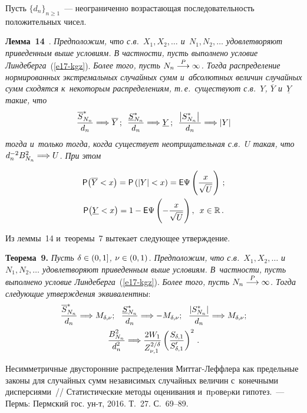 \begin{multicols}{2}
Пусть $\{d_n\}_{n\ge1}$~--- неограниченно возрастающая
последовательность положительных чисел.

\smallskip

\noindent
\textbf{Лемма~14}~\cite{Korolev1994}. \textit{Предположим, что с.в.\
$X_1,X_2,\ldots$ и~$N_1,N_2,\ldots$ удовлетворяют приведенным выше
условиям. В частности, пусть выполнено условие Линдеберга}~(\ref{e17-kgz}).
\textit{Более того, пусть $N_n\stackrel{P}{\longrightarrow}\infty$. Тогда распределение нормированных
экстремальных случайных сумм и~абсолютных величин случайных сумм
сходятся к~некоторым распределениям, т.\,е.\ существуют с.в.~$Y$,
$\overline Y$ и~$\underline Y$ такие, что}
$$
\displaystyle\frac{\displaystyle \overline S^*_{N_n}\mathstrut}{\displaystyle d_n\mathstrut}\Longrightarrow \overline Y\,;\enskip 
\displaystyle\frac{\displaystyle \underline S^*_{N_n}\mathstrut}{\displaystyle d_n\mathstrut}\Longrightarrow \underline Y\,; \enskip
\displaystyle\frac{\displaystyle \left\vert S^*_{N_n}\right\vert\mathstrut}{\displaystyle d_n\mathstrut}\Longrightarrow |Y|
$$
\textit{тогда и~только тогда, когда существует неотрицательная с.в.~$U$
такая, что $d_n^{-2}B^2_{N_n}\hm\Longrightarrow U$. При этом}

\noindent
\begin{gather*}
{\sf P}\big(\overline Y<x\big)={\sf P}\left(|Y|<x\right)= {\sf E}
\Psi\left(\displaystyle\frac{\displaystyle x\mathstrut}{\displaystyle \sqrt{U}\mathstrut}\right)\,;\\ 
{\sf P}\big(\underline
Y<x\big) =1-{\sf E}\Psi\left(-\displaystyle\frac{\displaystyle x\mathstrut}{\displaystyle \sqrt{U}\mathstrut}\right),\enskip
x\in\mathbb{R}\,.
\end{gather*}


Из леммы~14 и~теоремы~7 вытекает следующее утверждение.

\smallskip

\noindent
\textbf{Теорема~9.} \textit{Пусть $\delta\hm\in(0,1]$, $\nu\hm\in(0,1)$.
Предположим, что с.в.\ $X_1,X_2,\ldots$ и~$N_1,N_2,\ldots$
удовлетворяют приведенным выше условиям. В~частности, пусть
выполнено условие Линдеберга}~(\ref{e17-kgz}). \textit{Более того, пусть
$N_n\hm\pto\infty$. Тогда следующие утверждения эквивалентны}:
\begin{gather*}
\fr{\overline S^*_{N_n}}{d_n}\Longrightarrow M_{\delta,\nu}; \ \ 
\fr{\underline S^*_{N_n}}{d_n}\Longrightarrow
-M_{\delta,\nu};\ \ 
 \fr{|S^*_{N_n}|}{d_n}\Longrightarrow
M_{\delta,\nu};\\ 
\fr{B^2_{N_n}}{d^2_n}\Longrightarrow
\fr{2W_1}{Z_{\nu,1}^{2/\delta}}\left(\fr{S_{\delta,1}}{S'_{\delta,1}}\right)^2\,.
\end{gather*}

\vspace*{-12pt}


{\small\frenchspacing
 {%
 \begin{thebibliography}{99}
 Несимметричные
дву\-сто\-ронние распределения Миттаг-Леффлера как предельные законы
для случайных сумм независимых случайных величин с~конечными
дисперсиями~// Статистические методы оценивания и~пpовеpки гипотез.~---
Пермь: Пермский гос. ун-т, 2016. 
Т.~27. С.~69--89.


\end{thebibliography}}}
\end{multicols}
